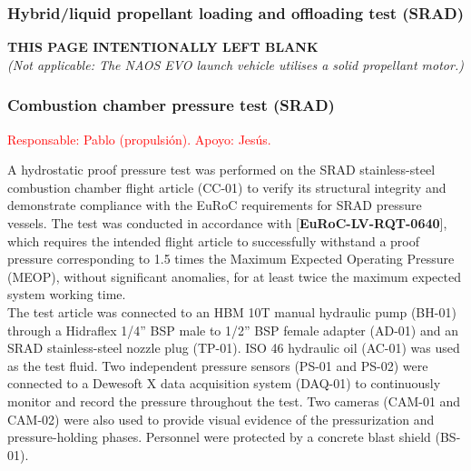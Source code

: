 \documentclass[11pt, a4paper]{article} %
\newcommand{\req}[1]{[\textcolor{EtseNavy}{\textbf{#1}}]}
\begin{document}
\subsubsection{Hybrid/liquid propellant loading and offloading test (SRAD)}
\vspace*{\fill}
\begin{center}
    \textbf{THIS PAGE INTENTIONALLY LEFT BLANK} \\
    \vspace{0.5cm}
    \textit{(Not applicable: The NAOS EVO launch vehicle utilises a solid propellant motor.)}
\end{center}
\vspace*{\fill}
\newpage

\subsubsection{Combustion chamber pressure test (SRAD)} \textcolor{red}{Responsable: Pablo (propulsión). Apoyo: Jesús.}

A hydrostatic proof pressure test was performed on the SRAD stainless-steel combustion chamber flight article (CC-01) to verify its structural integrity and demonstrate compliance with the EuRoC requirements for SRAD pressure vessels. The test was conducted in accordance with \req{EuRoC-LV-RQT-0640}, which requires the intended flight article to successfully withstand a proof pressure corresponding to 1.5 times the Maximum Expected Operating Pressure (MEOP), without significant anomalies, for at least twice the maximum expected system working time.\\

The test article was connected to an HBM 10T manual hydraulic pump (BH-01) through a Hidraflex 1/4” BSP male to 1/2” BSP female adapter (AD-01) and an SRAD stainless-steel nozzle plug (TP-01). ISO 46 hydraulic oil (AC-01) was used as the test fluid. Two independent pressure sensors (PS-01 and PS-02) were connected to a Dewesoft X data acquisition system (DAQ-01) to continuously monitor and record the pressure throughout the test. Two cameras (CAM-01 and CAM-02) were also used to provide visual evidence of the pressurization and pressure-holding phases. Personnel were protected by a concrete blast shield (BS-01).
\end{document}
